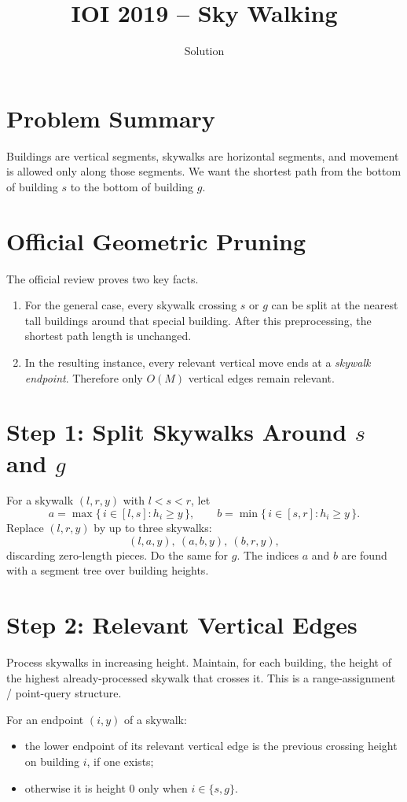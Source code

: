 \documentclass[11pt,a4paper]{article}
\title{IOI 2019 -- Sky Walking}
\author{Solution}
\date{}
\begin{document}
\maketitle

\section{Problem Summary}
Buildings are vertical segments, skywalks are horizontal segments, and movement is allowed only
along those segments.
We want the shortest path from the bottom of building $s$ to the bottom of building $g$.

\section{Official Geometric Pruning}
The official review proves two key facts.

\begin{enumerate}
  \item For the general case, every skywalk crossing $s$ or $g$ can be split at the nearest tall
        buildings around that special building. After this preprocessing, the shortest path length is
        unchanged.
  \item In the resulting instance, every relevant vertical move ends at a \emph{skywalk endpoint}.
        Therefore only $O(M)$ vertical edges remain relevant.
\end{enumerate}

\section{Step 1: Split Skywalks Around $s$ and $g$}
For a skywalk $(l,r,y)$ with $l < s < r$, let
\[
a = \max\{\,i \in [l,s] : h_i \ge y\,\}, \qquad
b = \min\{\,i \in [s,r] : h_i \ge y\,\}.
\]
Replace $(l,r,y)$ by up to three skywalks:
\[
(l,a,y),\ (a,b,y),\ (b,r,y),
\]
discarding zero-length pieces.
Do the same for $g$.
The indices $a$ and $b$ are found with a segment tree over building heights.

\section{Step 2: Relevant Vertical Edges}
Process skywalks in increasing height.
Maintain, for each building, the height of the highest already-processed skywalk that crosses it.
This is a range-assignment / point-query structure.

For an endpoint $(i,y)$ of a skywalk:
\begin{itemize}
  \item the lower endpoint of its relevant vertical edge is the previous crossing height on
        building $i$, if one exists;
  \item otherwise it is height $0$ only when $i \in \{s,g\}$.
\end{itemize}
\end{document}
